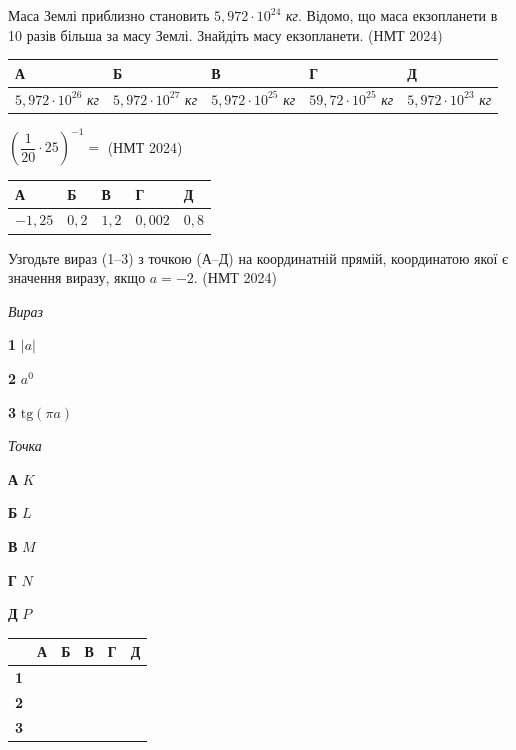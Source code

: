 \documentclass[14pt]{extarticle}
\newcommand{\answerTable}[5]{
\begin{center}
\begin{tabular}{|*{5}{>{\centering\arraybackslash}m{2.8cm}|}}
\hline
\rule[-0.3cm]{0pt}{0.8cm}\textbf{А} & \textbf{Б} & \textbf{В} & \textbf{Г} & \textbf{Д} \\
\hline
\rule[-0.4cm]{0pt}{1.0cm}#1 & \rule[-0.4cm]{0pt}{1.0cm}#2 & \rule[-0.4cm]{0pt}{1.0cm}#3 & \rule[-0.4cm]{0pt}{1.0cm}#4 & \rule[-0.4cm]{0pt}{1.0cm}#5 \\
\hline
\end{tabular}
\end{center}
}
\newcommand{\matchTable}{
\begin{tabular}{|>{\centering\arraybackslash}p{0.2cm}|*{5}{>{\centering\arraybackslash}p{0.2cm}|}}
\hline
& \textbf{А} & \textbf{Б} & \textbf{В} & \textbf{Г} & \textbf{Д} \\
\hline
\textbf{1} & \rule{0pt}{0.2cm} & & & & \\
\hline
\textbf{2} & \rule{0pt}{0.2cm} & & & & \\
\hline
\textbf{3} & \rule{0pt}{0.2cm} & & & & \\
\hline
\end{tabular}
}
\newcommand{\task}[2]{\noindent\makebox[1.5em][l]{\textbf{#1.}}\parbox[t]{\dimexpr\textwidth-1.5em}{#2}}
\newcommand{\nmtyear}[1]{\hfill{\small\color{yearcolor}(НМТ #1)}}
\begin{document}
\vspace{0.5cm}

\task{34}{Маса Землі приблизно становить $5{,}972 \cdot 10^{24}$ \textit{кг}. Відомо, що маса екзопланети в 10 разів більша за масу Землі. Знайдіть масу екзопланети. \nmtyear{2024}}
\answerTable{$5{,}972 \cdot 10^{26}$ \textit{кг}}{$5{,}972 \cdot 10^{27}$ \textit{кг}}{$5{,}972 \cdot 10^{25}$ \textit{кг}}{$59{,}72 \cdot 10^{25}$ \textit{кг}}{$5{,}972 \cdot 10^{23}$ \textit{кг}}

\vspace{0.5cm}

\task{35}{$\left(\dfrac{1}{20} \cdot 25\right)^{-1} =$ \nmtyear{2024}}
\answerTable{$-1{,}25$}{$0{,}2$}{$1{,}2$}{$0{,}002$}{$0{,}8$}

\vspace{0.5cm}

\task{36}{Узгодьте вираз (1--3) з точкою (А--Д) на координатній прямій, координатою якої є значення виразу, якщо $a = -2$. \nmtyear{2024}}

\vspace{0.3cm}
\begin{center}
\end{center}

\vspace{0.3cm}
\begin{minipage}{0.35\textwidth}
\textit{Вираз}

\vspace{0.2cm}
\textbf{1} \quad $|a|$

\vspace{0.2cm}
\textbf{2} \quad $a^0$

\vspace{0.2cm}
\textbf{3} \quad $\mathrm{tg}(\pi a)$
\end{minipage}
\hfill
\begin{minipage}{0.35\textwidth}
\textit{Точка}

\vspace{0.2cm}
\textbf{А} \quad $K$

\vspace{0.2cm}
\textbf{Б} \quad $L$

\vspace{0.2cm}
\textbf{В} \quad $M$

\vspace{0.2cm}
\textbf{Г} \quad $N$

\vspace{0.2cm}
\textbf{Д} \quad $P$
\end{minipage}
\hfill
\begin{minipage}{0.2\textwidth}
\matchTable
\end{minipage}
\end{document}
